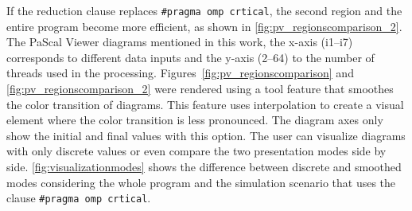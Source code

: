 If the reduction clause replaces {\tt \#pragma~omp~crtical}, the second region and the entire program become more efficient, as shown in \cref{fig:pv_regionscomparison_2}. The PaScal Viewer diagrams mentioned in this work, the x-axis (i1--i7) corresponds to different data inputs and the y-axis (2--64) to the number of threads used in the processing. Figures~\ref{fig:pv_regionscomparison} and \ref{fig:pv_regionscomparison_2} were rendered using a tool feature that smoothes the color transition of diagrams. This feature uses interpolation to create a visual element where the color transition is less pronounced. The diagram axes only show the initial and final values with this option. The user can visualize diagrams with only discrete values or even compare the two presentation modes side by side. \cref{fig:visualizationmodes} shows the difference between discrete and smoothed modes considering the whole program and the simulation scenario that uses the clause {\tt \#pragma~omp~crtical}.
